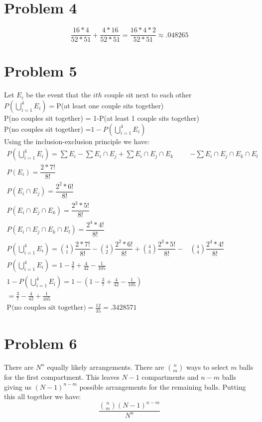 \documentclass{article}
\begin{document}
\begin{flushleft}
\section*{Problem 4}
\[\dfrac{16*4}{52*51}+\dfrac{4*16}{52*51} = \dfrac{16*4*2}{52*51} \approx .048265
\]
\section*{Problem 5}
Let $E_i$ be the event that the $ith$ couple sit next to each other\\
$P\left(\bigcup_{i=1}^{4}E_i\right)=$P(at least one couple sits together)\\
P(no couples sit together) = 1-P(at least 1 couple sits together)\\
P(no couples sit together) =$1-P\left(\bigcup_{i=1}^{4}E_i\right)$\\
Using the inclusion-exclusion principle we have:
\begin{align*}
P\left(\bigcup_{i=1}^{4}E_i\right)= \sum E_i -\sum E_i \cap E_j +\sum E_i \cap E_j \cap E_k& -\sum E_i \cap E_j \cap E_k \cap E_l\\
P(E_i)=\dfrac{2*7!}{8!}&\\
P(E_i\cap E_j)=\dfrac{2^2*6!}{8!}&\\
P(E_i\cap E_j \cap E_k)=\dfrac{2^3*5!}{8!}&\\
P(E_i\cap E_j \cap E_k \cap E_l)=\dfrac{2^4*4!}{8!}&\\
P\left(\bigcup_{i=1}^{4}E_i\right)={4\choose 1}\dfrac{2*7!}{8!}-{4\choose 2}\dfrac{2^2*6!}{8!}+{4\choose 3}\dfrac{2^3*5!}{8!}-&{4 \choose 4}\dfrac{2^4*4!}{8!}\\
P\left(\bigcup_{i=1}^{4}E_i\right)=1-\frac{3}{7}+\frac{4}{42}-\frac{1}{105}&\\
1-P\left(\bigcup_{i=1}^{4}E_i\right)=1-\left(1-\frac{3}{7}+\frac{4}{42}-\frac{1}{105}\right)&\\
=\frac{3}{7}-\frac{4}{42}+\frac{1}{105}\\
\text{P(no couples sit together)}=\frac{12}{35} =.3428571&
\end{align*}
\section*{Problem 6}
There are $N^n$ equally likely arrangements. There are $\binom{n}{m}$ ways to select $m$ balls for the first compartment. This leaves $N-1$ compartments and $n-m$ balls giving us $(N-1)^{n-m}$ possible arrangements for the remaining balls. Putting this all together we have:
\[\dfrac{\binom{n}{m}(N-1)^{n-m}}{N^n}
\]
\newpage

\end{flushleft}
\end{document}
